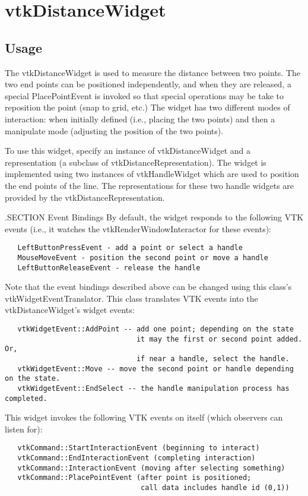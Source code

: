 \section{vtkDistanceWidget}

\subsection{Usage}

 The vtkDistanceWidget is used to measure the distance between two points.
 The two end points can be positioned independently, and when they are
 released, a special PlacePointEvent is invoked so that special operations
 may be take to reposition the point (snap to grid, etc.) The widget has
 two different modes of interaction: when initially defined (i.e., placing
 the two points) and then a manipulate mode (adjusting the position of
 the two points).

 To use this widget, specify an instance of vtkDistanceWidget and a
 representation (a subclass of vtkDistanceRepresentation). The widget is
 implemented using two instances of vtkHandleWidget which are used to
 position the end points of the line. The representations for these two
 handle widgets are provided by the vtkDistanceRepresentation.

 .SECTION Event Bindings
 By default, the widget responds to the following VTK events (i.e., it
 watches the vtkRenderWindowInteractor for these events):
 \begin{verbatim}
   LeftButtonPressEvent - add a point or select a handle
   MouseMoveEvent - position the second point or move a handle
   LeftButtonReleaseEvent - release the handle
 \end{verbatim}

 Note that the event bindings described above can be changed using this
 class's vtkWidgetEventTranslator. This class translates VTK events
 into the vtkDistanceWidget's widget events:
 \begin{verbatim}
   vtkWidgetEvent::AddPoint -- add one point; depending on the state
                               it may the first or second point added. Or,
                               if near a handle, select the handle.
   vtkWidgetEvent::Move -- move the second point or handle depending on the state.
   vtkWidgetEvent::EndSelect -- the handle manipulation process has completed.
 \end{verbatim}

 This widget invokes the following VTK events on itself (which observers
 can listen for):
 \begin{verbatim}
   vtkCommand::StartInteractionEvent (beginning to interact)
   vtkCommand::EndInteractionEvent (completing interaction)
   vtkCommand::InteractionEvent (moving after selecting something)
   vtkCommand::PlacePointEvent (after point is positioned;
                                call data includes handle id (0,1))
 \end{verbatim}

